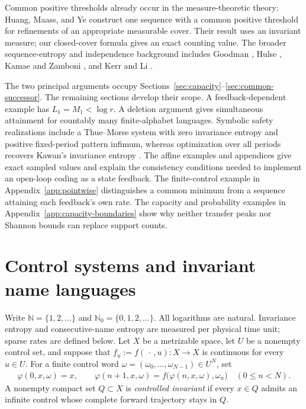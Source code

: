 \documentclass[11pt,reqno]{amsart}
\numberwithin{equation}{section}
\theoremstyle{definition}
\newcommand{\N}{\mathbb N}
\newcommand{\Nzero}{\mathbb N_0}
\begin{document}
Common positive thresholds already occur in the measure-theoretic
theory: Huang, Maass, and Ye \cite[Lemma~3.3 and Theorem~3.5]{HuangMaassYe2004}
construct one sequence with a common positive threshold for refinements
of an appropriate measurable cover. Their result uses an invariant
measure; our closed-cover formula gives an exact counting value.
The broader sequence-entropy and independence background includes
Goodman \cite{Goodman1974}, Hulse \cite{Hulse1982}, Kamae and Zamboni
\cite{KamaeZamboniSystems2002}, and Kerr and Li \cite{KL2007,KL2009}.

The two principal arguments occupy
Sections~\ref{sec:capacity}--\ref{sec:common-successor}.
The remaining sections develop their scope. A feedback-dependent
example has $L_1=M_1<\log r$. A deletion argument gives simultaneous
attainment for countably many finite-alphabet languages. Symbolic safety
realizations include a Thue--Morse system with zero invariance entropy
and positive fixed-period pattern infimum, whereas optimization over
all periods recovers Kawan's invariance entropy \cite{Kawan2013}.
The affine examples and appendices give exact sampled values and
explain the consistency conditions needed to implement an open-loop
coding as a state feedback. The finite-control example in
Appendix~\ref{app:pointwise} distinguishes a common minimum from a
sequence attaining each feedback's own rate. The capacity and
probability examples in Appendix~\ref{app:capacity-boundaries} show
why neither transfer peaks nor Shannon bounds can replace support counts.


\section{Control systems and invariant name languages}\label{sec:control}

Write $\N=\{1,2,\ldots\}$ and $\Nzero=\{0,1,2,\ldots\}$.
All logarithms are natural. Invariance entropy and consecutive-name entropy
are measured per physical time unit; sparse rates are defined below.
Let $X$ be a
metrizable space, let $U$ be a nonempty control set, and suppose that
$f_u:=f(\,\cdot\,,u):X\to X$ is continuous for every $u\in U$.  For a finite
control word $\omega=(\omega_0,\ldots,\omega_{N-1})\in U^N$, set
\begin{align*}
 \varphi(0,x,\omega)=x,
 \qquad
 \varphi(n+1,x,\omega)
 =f\bigl(\varphi(n,x,\omega),\omega_n\bigr)
 \quad(0\le n<N).
\end{align*}
A nonempty compact set $Q\subset X$ is \emph{controlled invariant} if every
$x\in Q$ admits an infinite control whose complete forward trajectory stays in
$Q$.
\end{document}
